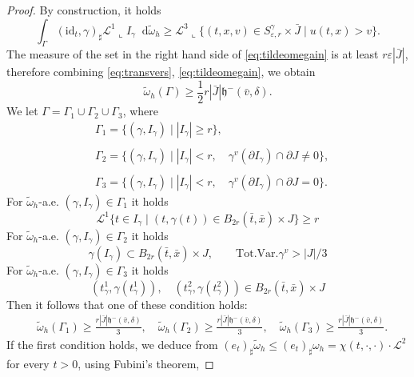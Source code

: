 \documentclass[11pt, twoside, reqno]{amsart}
\theoremstyle{definition}
\theoremstyle{remark}
\numberwithin{equation}{section}
\newcommand*\dif{\mathop{}\!\mathrm{d}}
\newcommand{\mr}[1]{\mathrm{#1}}
\newcommand{\msc}[1]{\mathscr{#1}}
\begin{document}
\begin{proof}
By construction, it holds
\begin{equation}\label{eq:tildeomegain}
\int_{\Gamma} (\mr{id}_t, \gamma)_{\sharp} \msc L^1\llcorner I_{\gamma} \dif \tilde \omega_h \geq \msc L^3 \llcorner \Big\{(t, x, v) \in S^\gamma_{\varepsilon, r} \times \bar J \; \Big| \;  u(t,x) > v      \Big\}.
\end{equation}
The measure of the set in the right hand side of \eqref{eq:tildeomegain} is at least $r\varepsilon |\bar J|$, therefore combining \eqref{eq:transvers}, \eqref{eq:tildeomegain}, we obtain
\begin{equation}
\tilde \omega_h (\Gamma) \geq  \frac{1}{2}r |\bar J| \mathfrak h^-(\bar v, \delta).
\end{equation}
We let $\Gamma = \Gamma_1 \cup \Gamma_2 \cup \Gamma_3$, where 
$$
\begin{aligned}
& \Gamma_1 = \big\{ (\gamma, I_{\gamma}) \; \big| \; |I_{\gamma} | \geq r\big\},\\
& \\
& \Gamma_2 = \big\{ (\gamma, I_{\gamma}) \; \big| \; |I_{\gamma}| < r, \quad \gamma^v(\partial I_{\gamma}) \cap  \partial J\neq 0 \big\},\\
& \\
& \Gamma_3 = \big\{ (\gamma, I_{\gamma}) \; \big| \; |I_{\gamma}| < r, \quad \gamma^v(\partial I_{\gamma})\cap  \partial J = 0 \big\}.
\end{aligned}
$$
For $\tilde \omega_h$-a.e. $(\gamma, I_{\gamma}) \in \Gamma_1$ it holds
$$
\msc L^1 \big\{ t \in I_{\gamma} \; \big| \; (t, \gamma(t)) \in B_{2r}(\bar t, \bar x) \times J\big\} \geq r 
$$
For $\tilde \omega_h$-a.e. $(\gamma, I_{\gamma}) \in \Gamma_2$ it holds
$$
\gamma(I_{\gamma}) \subset B_{2r}(\bar t, \bar x)\times J, \qquad \mr{Tot.Var.} \gamma^v > |J|/3
$$
For $\tilde \omega_h$-a.e. $(\gamma, I_{\gamma}) \in \Gamma_3$ it holds
$$
(t^1_{\gamma}, \gamma(t^1_{\gamma})), \quad (t^2_{\gamma}, \gamma(t^2_{\gamma})) \in  B_{2r}(\bar t, \bar x) \times J
$$
Then it follows that one of these condition holds: 
\begin{equation}
\begin{aligned}
& \tilde \omega_h(\Gamma_1) \geq \frac{r|\bar J| \mathfrak h^-(\bar v, \delta)}{3}, \quad \tilde \omega_h(\Gamma_2) \geq \frac{r|\bar J| \mathfrak h^-(\bar v, \delta)}{3}, \quad \tilde \omega_h(\Gamma_3) \geq \frac{r|\bar J| \mathfrak h^-(\bar v, \delta)}{3}.
\end{aligned}
\end{equation}
If the first condition holds, we deduce from $(e_t)_\sharp \tilde \omega_h \leq (e_t)_\sharp  \omega_h = \chi(t, \cdot, \cdot) \cdot \mathscr L^2$ for every $t> 0$, using Fubini's theorem,

\end{proof}
\end{document}
